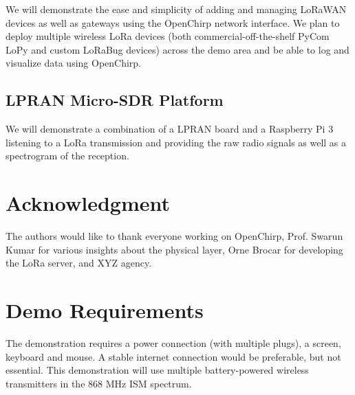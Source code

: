 \documentclass[conference]{IEEEtran}
\begin{document}
We will demonstrate the ease and simplicity of adding and managing LoRaWAN
devices as well as gateways using the OpenChirp network interface. We plan to
deploy multiple wireless LoRa devices (both commercial-off-the-shelf PyCom
LoPy and custom LoRaBug devices) across the demo area and be able to log and
visualize data using OpenChirp.


\subsection{LPRAN Micro-SDR Platform}
\label{sec:lpran-demo}

We will demonstrate a combination of a LPRAN board and a Raspberry Pi 3
listening to a LoRa transmission and providing the raw radio signals as well
as a spectrogram of the reception.

\section*{Acknowledgment}

The authors would like to thank everyone working on OpenChirp, Prof. Swarun Kumar
for various insights about the physical layer, Orne Brocar for developing the
LoRa server, and {\color{red} XYZ} agency.




\section{Demo Requirements}
\label{sec:requirements}

The demonstration requires a power connection (with multiple plugs), a screen,
keyboard and mouse. A stable internet connection would be preferable, but not
essential. This demonstration will use multiple battery-powered wireless
transmitters in the 868 MHz ISM spectrum.
\end{document}
